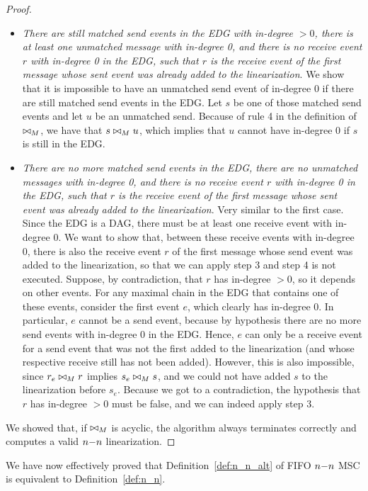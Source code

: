 \begin{proof}
\begin{itemize}
	\item \emph{There are still matched send events in the EDG with in-degree $>0$, there is at least one unmatched message with in-degree 0, and there is no receive event $r$ with in-degree 0 in the EDG, such that $r$ is the receive event of the first message whose sent event was already added to the linearization}. We show that it is impossible to have an unmatched send event of in-degree 0 if there are still matched send events in the EDG. Let $s$ be one of those matched send events and let $u$ be an unmatched send. Because of rule 4 in the definition of $\bowtie_M$, we have that $s \bowtie_M u$, which implies that $u$ cannot have in-degree 0 if $s$ is still in the EDG.
	\item \emph{There are no more matched send events in the EDG, there are no unmatched messages with in-degree 0, and there is no receive event $r$ with in-degree 0 in the EDG, such that $r$ is the receive event of the first message whose sent event was already added to the linearization}. Very similar to the first case. Since the EDG is a DAG, there must be at least one receive event with in-degree 0. We want to show that, between these receive events with in-degree 0, there is also the receive event $r$ of the first message whose send event was added to the linearization, so that we can apply step 3 and step 4 is not executed. Suppose, by contradiction, that $r$ has in-degree $>0$, so it depends on other events. For any maximal chain in the EDG that contains one of these events, consider the first event $e$, which clearly has in-degree 0. In particular, $e$ cannot be a send event, because by hypothesis there are no more send events with in-degree 0 in the EDG. Hence, $e$ can only be a receive event for a send event that was not the first added to the linearization (and whose respective receive still has not been added). However, this is also impossible, since $r_e \bowtie_M r$ implies $s_e \bowtie_M s$, and we could not have added $s$ to the linearization before $s_e$. Because we got to a contradiction, the hypothesis that $r$ has in-degree $>0$ must be false, and we can indeed apply step 3.
\end{itemize}
We showed that, if $\bowtie_M$ is acyclic, the algorithm always terminates correctly and computes a valid $n\mathsf{-}n$ linearization.
\end{proof}

\noindent We have now effectively proved that Definition~\ref{def:n_n_alt} of FIFO $n\mathsf{-}n$ MSC is equivalent to Definition~\ref{def:n_n}.

